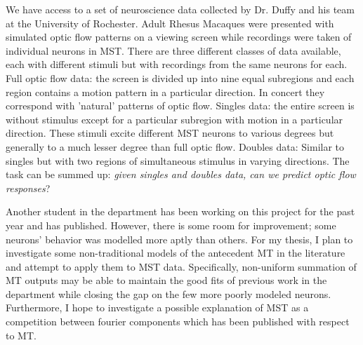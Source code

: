\documentclass{elsart1p}
\begin{document}
We have access to a set of neuroscience data collected by Dr. Duffy and his
team at the University of Rochester.  Adult Rhesus Macaques were presented
with simulated optic flow patterns on a viewing screen while recordings
were taken of individual neurons in MST.  There are three different classes of
data available, each with different stimuli but with recordings from the same
neurons for each.  Full optic flow data:  the screen is divided up into nine 
equal subregions and each region contains a motion pattern in a particular 
direction.  In concert they correspond with 'natural' patterns of optic flow.
Singles data:  the entire screen is without stimulus except for a particular
subregion with motion in a particular direction.  These stimuli excite
different MST neurons to various degrees but generally to a much lesser degree
than full optic flow.  Doubles data:  Similar to singles but with two regions
of simultaneous stimulus in varying directions.
The task can be summed up: \textit{given singles and doubles data, can we 
predict optic flow responses}?

Another student in the department has been working on this project for the
past year and has published.  However, there is some room for improvement;
some neurons' behavior was modelled more aptly than others.  For my thesis,
I plan to investigate some non-traditional models of the antecedent MT in
the literature and attempt to apply them to MST data.  Specifically,
non-uniform summation of MT outputs may be able to maintain the good fits
of previous work in the department while closing the gap on the few more 
poorly modeled neurons.
Furthermore, I hope to investigate a possible explanation of MST as a
competition between fourier components which has been published with 
respect to MT.

\vspace{20pt}


\vspace{30pt}
\end{document}
